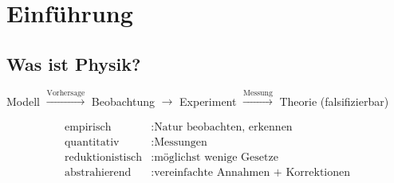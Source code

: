 \documentclass[a4paper,12pt]{article}
\numberwithin{equation}{section}
\begin{document}
\section{Einführung}

\subsection{Was ist Physik?}
\begin{center}
        Modell $\xrightarrow{\text{Vorhersage}} $ Beobachtung $\rightarrow $ Experiment $\xrightarrow{\text{Messung}} $ Theorie (falsifizierbar)
\end{center}
\begin{align*}
        \text{empirisch}&:\text{Natur beobachten, erkennen}\\
        \text{quantitativ}&:\text{Messungen}\\
        \text{reduktionistisch}&:\text{möglichst wenige Gesetze}\\
        \text{abstrahierend}&:\text{vereinfachte Annahmen + Korrektionen}
\end{align*}
\end{document}
